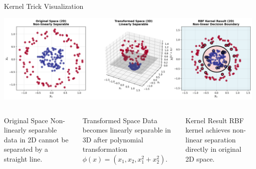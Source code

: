 \documentclass[8pt,aspectratio=1610]{beamer}
\begin{document}
\begin{frame}{Kernel Trick Visualization}
\begin{center}
\includegraphics[width=\textwidth]{../figures/kernel_trick_transformation.png}
\end{center}

\begin{columns}[t]
\begin{column}{0.32\textwidth}
\begin{alertblock}{Original Space}
Non-linearly separable data in 2D cannot be separated by a straight line.
\end{alertblock}
\end{column}

\begin{column}{0.32\textwidth}
\begin{alertblock}{Transformed Space}
Data becomes linearly separable in 3D after polynomial transformation $\phi(x) = (x_1, x_2, x_1^2 + x_2^2)$.
\end{alertblock}
\end{column}

\begin{column}{0.32\textwidth}
\begin{alertblock}{Kernel Result}
RBF kernel achieves non-linear separation directly in original 2D space.
\end{alertblock}
\end{column}
\end{columns}
\end{frame}
\end{document}
